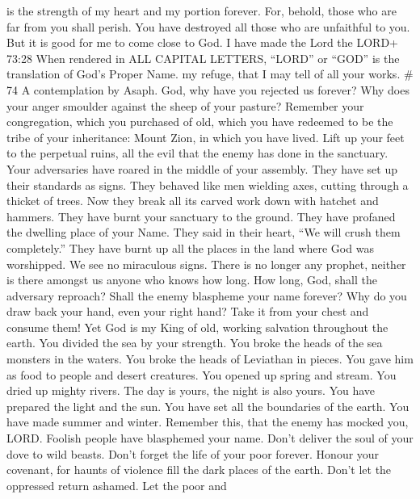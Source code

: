 is the strength of my heart and my portion forever.  For,
behold, those who are far from you shall perish. You have destroyed all
those who are unfaithful to you.  But it is good for me to
come close to God. I have made the Lord the LORD+ 73:28 When rendered in
ALL CAPITAL LETTERS, ``LORD'' or ``GOD'' is the translation of God's
Proper Name. my refuge, that I may tell of all your works. \# 74 A
contemplation by Asaph.  God, why have you rejected us
forever? Why does your anger smoulder against the sheep of your pasture?
 Remember your congregation, which you purchased of old,
which you have redeemed to be the tribe of your inheritance: Mount Zion,
in which you have lived.  Lift up your feet to the perpetual
ruins, all the evil that the enemy has done in the sanctuary.
 Your adversaries have roared in the middle of your
assembly. They have set up their standards as signs.  They
behaved like men wielding axes, cutting through a thicket of trees.
 Now they break all its carved work down with hatchet and
hammers.  They have burnt your sanctuary to the ground. They
have profaned the dwelling place of your Name.  They said in
their heart, ``We will crush them completely.'' They have burnt up all
the places in the land where God was worshipped.  We see no
miraculous signs. There is no longer any prophet, neither is there
amongst us anyone who knows how long.  How long, God, shall
the adversary reproach? Shall the enemy blaspheme your name forever?
 Why do you draw back your hand, even your right hand? Take
it from your chest and consume them!  Yet God is my King of
old, working salvation throughout the earth.  You divided
the sea by your strength. You broke the heads of the sea monsters in the
waters.  You broke the heads of Leviathan in pieces. You
gave him as food to people and desert creatures.  You
opened up spring and stream. You dried up mighty rivers. 
The day is yours, the night is also yours. You have prepared the light
and the sun.  You have set all the boundaries of the earth.
You have made summer and winter.  Remember this, that the
enemy has mocked you, LORD. Foolish people have blasphemed your name.
 Don't deliver the soul of your dove to wild beasts. Don't
forget the life of your poor forever.  Honour your
covenant, for haunts of violence fill the dark places of the earth.
 Don't let the oppressed return ashamed. Let the poor and
